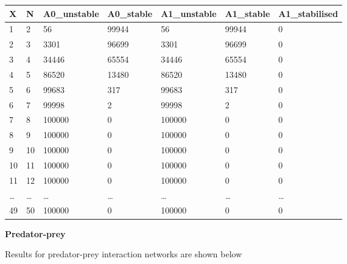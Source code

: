\documentclass[]{article}
\begin{document}
\begin{longtable}[]{@{}lllllll@{}}
\toprule
X & N & A0\_unstable & A0\_stable & A1\_unstable & A1\_stable &
A1\_stabilised\tabularnewline
\midrule
\endhead
1 & 2 & 56 & 99944 & 56 & 99944 & 0\tabularnewline
2 & 3 & 3301 & 96699 & 3301 & 96699 & 0\tabularnewline
3 & 4 & 34446 & 65554 & 34446 & 65554 & 0\tabularnewline
4 & 5 & 86520 & 13480 & 86520 & 13480 & 0\tabularnewline
5 & 6 & 99683 & 317 & 99683 & 317 & 0\tabularnewline
6 & 7 & 99998 & 2 & 99998 & 2 & 0\tabularnewline
7 & 8 & 100000 & 0 & 100000 & 0 & 0\tabularnewline
8 & 9 & 100000 & 0 & 100000 & 0 & 0\tabularnewline
9 & 10 & 100000 & 0 & 100000 & 0 & 0\tabularnewline
10 & 11 & 100000 & 0 & 100000 & 0 & 0\tabularnewline
11 & 12 & 100000 & 0 & 100000 & 0 & 0\tabularnewline
\ldots{} & \ldots{} & \ldots{} & \ldots{} & \ldots{} & \ldots{} &
\ldots{}\tabularnewline
49 & 50 & 100000 & 0 & 100000 & 0 & 0\tabularnewline
\bottomrule
\end{longtable}

\textbf{Predator-prey}

Results for predator-prey interaction networks are shown below
\end{document}
